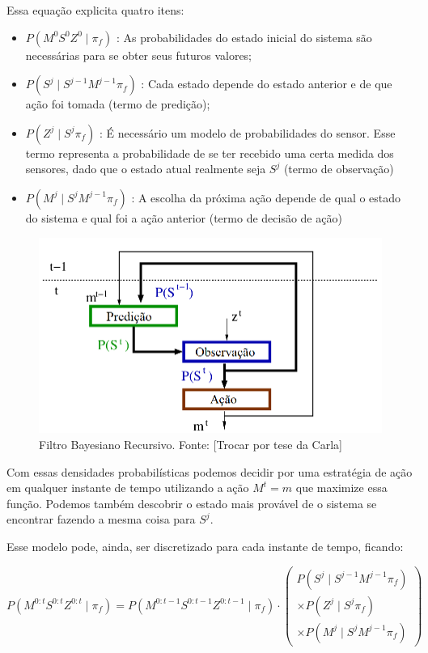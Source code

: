 Essa equação explicita quatro itens:

\begin{itemize}
  \item $ P \left( M^0 S^0 Z^0 \mid \pi_f \right) $ : As probabilidades do estado inicial do sistema são necessárias para se obter seus futuros valores;
  \item $ P \left( S^j \mid S^{j-1} M^{j-1} \pi_f \right) $ : Cada estado depende do estado anterior e de que ação foi tomada (termo de predição);
  \item $ P \left( Z^j \mid S^j \pi_f \right) $ : É necessário um modelo de probabilidades do sensor. Esse termo representa a probabilidade de se ter recebido uma certa medida dos sensores, dado que o estado atual realmente seja $ S^j $ (termo de observação)
  \item $ P \left( M^j \mid S^j M^{j-1} \pi_f \right) $ : A escolha da próxima ação depende de qual o estado do sistema e qual foi a ação anterior (termo de decisão de ação)
\end{itemize}

\begin{figure}[h]
    \centering
    \includegraphics[width=120mm]{images/modelo_bayesiano-carla}
    \caption{\label{img:ModeloProbabilisticoCarla}Filtro Bayesiano Recursivo. Fonte: \cite{INCA2005} [Trocar por tese da Carla]}
\end{figure}

Com essas densidades probabilísticas podemos decidir por uma estratégia de ação em qualquer instante de tempo utilizando a ação $ M^t = m $ que maximize essa função. Podemos também descobrir o estado mais provável de o sistema se encontrar fazendo a mesma coisa para $ S^j $.

Esse modelo pode, ainda, ser discretizado para cada instante de tempo, ficando:

\begin{equation}
        P ( M^{0: t} S^{0: t} Z^{0: t} \mid \pi_f ) = P ( M^{0: t-1} S^{0: t-1} Z^{0: t-1} \mid \pi_f ) \cdot 
        \left(
            \begin{array}{l}
                P( S^j \mid S^{j -1} M^{j -1} \pi_f ) \\
                \times P( Z^j \mid S^j \pi_f ) \\
                \times P( M^j \mid S^j M^{j -1} \pi_f )
            \end{array}
        \right)
\end{equation}

